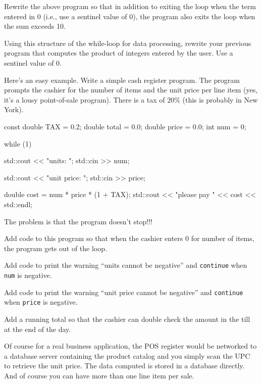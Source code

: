 \begin{ex}
Rewrite the above program so that in addition to exiting the
loop when the term entered in 0 (i.e., use a sentinel value of 0), the
program also exits the loop when the sum exceeds 10.
\end{ex}
\begin{ex}
Using this structure of the while-loop for data processing,
rewrite your previous program that computes the product of integers
entered by the user. Use a sentinel value of 0.
\end{ex}
\newpage{}

Here's an easy example. Write a simple cash register program. The program prompts the cashier for the number of items and the unit price per line item (yes, it's a lousy point-of-sale program). There is a tax of 20\% (this is probably in New York).

\begin{console}
const double TAX = 0.2;
double total = 0.0;
double price = 0.0;
int num = 0;

while (1)
{     
      std::cout << "units: ";
      std::cin >> num;

      std::cout << "unit price: ";
      std::cin >> price;

      double cost = num * price * (1 + TAX);
      std::cout << "please pay " << cost
                << std::endl;
} 
\end{console}

The problem is that the program doesn't stop!!!

\begin{ex}
Add code to this program so that when the cashier
enters 0 for number of items, the program gets out of the loop.
\end{ex}
\begin{ex} Add code to print the warning ``units cannot be
negative'' and \texttt{continue} when \texttt{num} is negative.
\end{ex}
\begin{ex} Add code to print the warning ``unit price cannot be
negative'' and \texttt{continue} when \texttt{price} is negative.
\end{ex}
\begin{ex} Add a running total so that the cashier can double
check the amount in the till at the end of the day.
\end{ex}
Of course for a real business application, the POS register would be
networked to a database server containing the product catalog and you
simply scan the UPC to retrieve the unit price. The data computed is
stored in a database directly. And of course you can have more than one
line item per sale.

